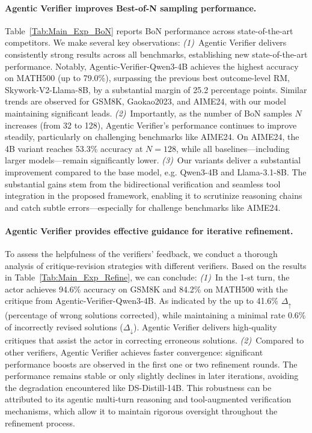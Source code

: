 \documentclass[11pt]{article}
\begin{document}
\paragraph{Agentic Verifier improves Best-of-N sampling performance.}
Table~\ref{Tab:Main_Exp_BoN} reports BoN performance across state-of-the-art competitors. 
We make several key observations:
\textit{(1)}~Agentic Verifier delivers consistently strong results across all benchmarks, establishing new state-of-the-art performance. Notably, Agentic-Verifier-Qwen3-4B achieves the highest accuracy on MATH500 (up to 79.0\%), surpassing the previous best outcome-level RM, Skywork-V2-Llama-8B, by a substantial margin of 25.2 percentage points. Similar trends are observed for GSM8K, Gaokao2023, and AIME24, with our model maintaining significant leads.
\textit{(2)}~Importantly, as the number of BoN samples $N$ increases (from 32 to 128), Agentic Verifier’s performance continues to improve steadily, particularly on challenging benchmarks like AIME24. On AIME24, the 4B variant reaches 53.3\% accuracy at $N=128$, while all baselines—including larger models—remain significantly lower. 
\textit{(3)}~Our variants deliver a substantial improvement compared to the base model, e.g. Qwen3-4B and Llama-3.1-8B.
The substantial gains stem from the bidirectional verification and seamless tool integration in the proposed framework, enabling it to scrutinize reasoning chains and catch subtle errors—especially for challenge benchmarks like AIME24.

\paragraph{Agentic Verifier provides effective guidance for iterative refinement.}
To assess the helpfulness of the verifiers' feedback, we conduct a thorough analysis of critique-revision strategies with different verifiers. 
Based on the results in Table~\ref{Tab:Main_Exp_Refine}, we can conclude:
\textit{(1)}~In the 1-st turn, the actor achieves 94.6\% accuracy on GSM8K and 84.2\% on MATH500 with the critique from Agentic-Verifier-Qwen3-4B.
As indicated by the up to 41.6\%  $\Delta_\uparrow$ (percentage of wrong solutions corrected), while maintaining a minimal rate 0.6\% of incorrectly revised solutions ($\Delta_\downarrow$).
Agentic Verifier delivers high-quality critiques that assist the actor in correcting erroneous solutions. 
\textit{(2)}~Compared to other verifiers, Agentic Verifier achieves faster convergence: significant performance boosts are observed in the first one or two refinement rounds. 
The performance remains stable or only slightly declines in later iterations, avoiding the degradation encountered like DS-Distill-14B. This robustness can be attributed to its agentic multi-turn reasoning and tool-augmented verification mechanisms, which allow it to maintain rigorous oversight throughout the refinement process.
\end{document}
